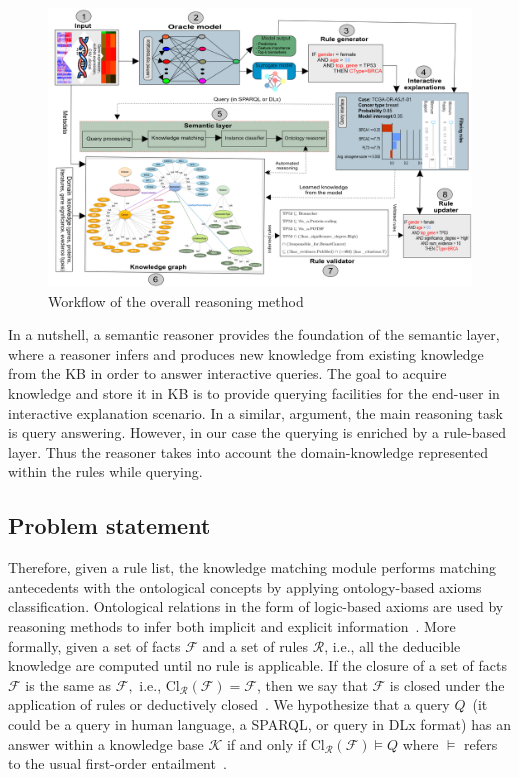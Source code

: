 \begin{figure}
	\centering
	\includegraphics[width=0.9\linewidth]{images/reasoning_wf.png}
	\caption{Workflow of the overall reasoning method} 
	\label{fig:reasoning_wf}
	\vspace{-2mm}
\end{figure} 

\hspace*{3.5mm} In a nutshell, a semantic reasoner provides the foundation of the semantic layer, where a reasoner infers and produces new knowledge from existing knowledge from the KB in order to answer interactive queries. 
The goal to acquire knowledge and store it in KB is to provide querying facilities for the end-user in interactive explanation scenario. In a similar, argument, the main reasoning task is query answering. However, in our case the querying is enriched by a rule-based layer. Thus the reasoner takes into account the domain-knowledge represented within the rules while querying. 

\subsection{Problem statement}
Therefore, given a rule list, the knowledge matching module performs matching antecedents with the ontological concepts by applying ontology-based axioms classification. Ontological relations in the form of logic-based axioms are used by reasoning methods to infer both implicit and explicit information~\cite{alirezaie2017ontology}. More formally, given a set of facts $\mathcal{F}$ and a set of rules $\mathcal{R}$, i.e., all the deducible knowledge are computed until no rule is applicable. If the closure of a set of facts $\mathcal{F}$ is the same as $\mathcal{F},$ i.e., $\mathrm{Cl}_{\mathcal{R}}(\mathcal{F})=\mathcal{F}$, then we say that $\mathcal{F}$ is closed under the application of rules or deductively closed~\cite{garoufallou2016metadata}. We hypothesize that a query $Q$~(it could be a query in human language, a SPARQL, or query in DLx format) has an answer within a knowledge base $\mathcal{K}$ if and only if $\mathrm{Cl}_{\mathcal{R}}(\mathcal{F}) \models Q$ where $\models$ refers to the usual first-order entailment~\cite{garoufallou2016metadata}. 

